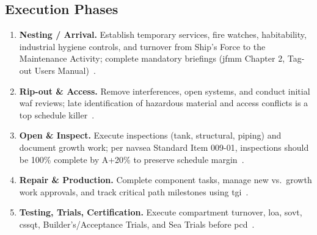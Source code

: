\documentclass[../main.tex]{subfiles}
\begin{document}
\subsection{Execution Phases}
\begin{enumerate}
  \item \textbf{Nesting / Arrival.} Establish temporary services, fire watches, habitability, industrial hygiene controls, and turnover from Ship's Force to the Maintenance Activity; complete mandatory briefings (\ac{jfmm} Chapter 2, Tag-out Users Manual)~\autocite{edo-4-2-2-cno-availability-execution-2025}.
  \item \textbf{Rip-out \& Access.} Remove interferences, open systems, and conduct initial \ac{waf} reviews; late identification of hazardous material and access conflicts is a top schedule killer~\autocite{COMFLTFORCOMINST4790-3}.
  \item \textbf{Open \& Inspect.} Execute inspections (tank, structural, piping) and document growth work; per \ac{navsea} Standard Item 009-01, inspections should be 100\% complete by A+20\% to preserve schedule margin~\autocite{edo-4-2-2-cno-availability-execution-2025}.
  \item \textbf{Repair \& Production.} Complete component tasks, manage new vs.\ growth work approvals, and track critical path milestones using \ac{tgi}~\autocite{edo-4-2-2-cno-availability-execution-2025}.
  \item \textbf{Testing, Trials, Certification.} Execute compartment turnover, \ac{loa}, \ac{sovt}, \ac{cssqt}, Builder's/Acceptance Trials, and Sea Trials before \ac{pcd}~\autocite{COMFLTFORCOMINST4790-3}.
\end{enumerate}
\end{document}
